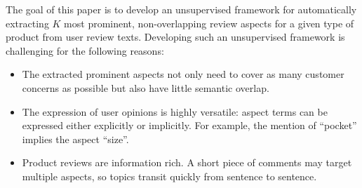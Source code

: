 
%

The goal of this paper is to develop an unsupervised framework 
for automatically extracting $K$ most prominent, non-overlapping 
review aspects for a given type of product from user review texts.  
Developing such an unsupervised framework is challenging for 
the following reasons: 
\begin{itemize}
	\item 
	The extracted prominent aspects not only need to cover as many customer concerns as possible but also have little semantic overlap. 
	\item The expression of user opinions is highly versatile: 
	aspect terms can be expressed either explicitly or implicitly. For example,
	the mention of ``pocket'' implies the aspect ``size''.
	\item Product reviews are information rich. A short piece of comments 
	may target multiple aspects, so topics transit quickly from sentence 
	to sentence. 
\end{itemize}

